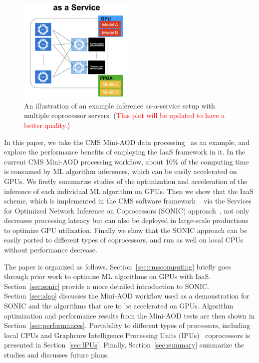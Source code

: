 \begin{figure}[htp]
    \centering
    \includegraphics[width=0.50\textwidth]{plots/illustration.png}
    \caption{An illustration of an example inference as-a-service setup with multiple coprocessor servers. (\textcolor{red}{This plot will be updated to have a better quality.})}
    \label{fig:illustration}
\end{figure}


In this paper, we take the CMS Mini-AOD data processing~\cite{Petrucciani:2015gjw} as an example, and explore the performance benefits of employing the IaaS framework in it. In the current CMS Mini-AOD processing workflow, about 10\% of the computing time is consumed by ML algorithm inferences, which can be easily accelerated on GPUs. We firstly summarize studies of the optimization and acceleration of the inference of each individual ML algorithm on GPUs. Then we show that the IaaS scheme, which is implemented in the CMS software framework \CMSSW~\cite{CMS:2006myw} via the Services for Optimized Network Inference on Coprocessors (SONIC) approach~\cite{Krupa:2020bwg}, not only decreases processing latency but can also be deployed in large-scale productions to optimize GPU utilization. Finally we show that the SONIC approach can be easily ported to different types of coprocessors, and run as well on local CPUs without performance decrease.

The paper is organized as follows. Section~\ref{sec:cmscomputing} briefly goes through prior work to optimize ML algorithms on GPUs with IaaS. Section~\ref{sec:sonic} provide a more detailed introduction to SONIC. Section~\ref{sec:algo} discusses the Mini-AOD workflow used as a demonstration for SONIC and the algorithms that are to be accelerated on GPUs.
Algorithm optimization and performance results from the Mini-AOD tests are then shown in Section~\ref{sec:performances}. Portability to different types of processors, including local CPUs and Graphcore Intelligence Processing Units (IPUs)~\cite{Graphcore, IPU_Perf} coprocessors is presented in Section~\ref{sec:IPUs}. Finally, Section~\ref{sec:summary} summarize the studies and discusses future plans.